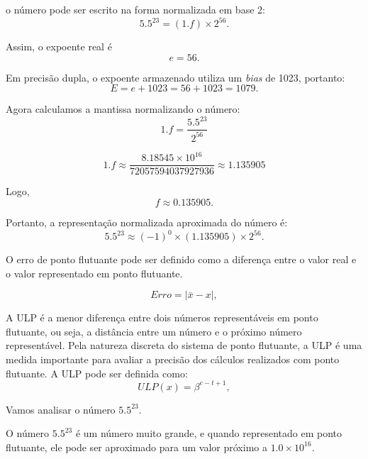 o número pode ser escrito na forma normalizada em base 2:
\begin{equation}
5.5^{23} = (1.f) \times 2^{56}.
\end{equation}

Assim, o expoente real é
\begin{equation}
e = 56.
\end{equation}

Em precisão dupla, o expoente armazenado utiliza um \textit{bias} de 1023, portanto:
\begin{equation}
E = e + 1023 = 56 + 1023 = 1079.
\end{equation}

Agora calculamos a mantissa normalizando o número:
\begin{equation}
1.f = \frac{5.5^{23}}{2^{56}}
\end{equation}

\begin{equation}
1.f \approx \frac{8.18545 \times 10^{16}}{72057594037927936} \approx 1.135905
\end{equation}

Logo,
\begin{equation}
f \approx 0.135905.
\end{equation}

Portanto, a representação normalizada aproximada do número é:
\begin{equation}
5.5^{23} \approx (-1)^0 \times (1.135905) \times 2^{56}.
\end{equation}

O erro de ponto flutuante pode ser definido como a diferença entre o valor real e o valor representado em ponto flutuante. 

\begin{equation}
Erro = \left|\bar{x} - x\right|,
\end{equation}

A ULP é a menor diferença entre dois números representáveis em ponto flutuante, ou seja, a distância entre um número e o próximo número representável. Pela natureza discreta do sistema de ponto flutuante, a ULP é uma medida importante para avaliar a precisão dos cálculos realizados com ponto flutuante. A ULP pode ser definida como:
\begin{equation}
ULP(x) = \beta^{e - t + 1},
\label{eq:ulp}
\end{equation}

Vamos analisar o número $5.5^{23}$.

O número $5.5^{23}$ é um número muito grande, e quando representado em ponto flutuante, ele pode ser aproximado para um valor próximo a $1.0 \times 10^{16}$.

